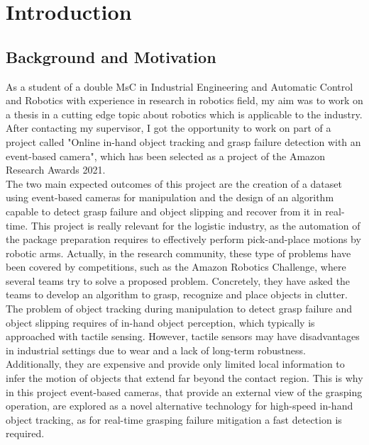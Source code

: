 \cleardoublepage\chapter{Introduction}\label{sec:introduction}

\section{Background and Motivation}

As a student of a double MsC in Industrial Engineering and Automatic Control and Robotics with experience in research in robotics field, my aim was to work on a thesis in a cutting edge topic about robotics which is applicable to the industry. After contacting my supervisor, I got the opportunity to work on part of a project called "Online in-hand object tracking and grasp failure detection with an event-based camera", which has been selected as a project of the Amazon Research Awards 2021.\\

The two main expected outcomes of this project are the creation of a dataset using event-based cameras for manipulation and the design of an algorithm capable to detect grasp failure and object slipping and recover from it in real-time. This project is really relevant for the logistic industry, as the automation of the package preparation requires to effectively perform pick-and-place motions by robotic arms. Actually, in the research community, these type of problems have been covered by competitions, such as the Amazon Robotics Challenge, where several teams try to solve a proposed problem. Concretely, they have asked the teams to develop an algorithm to grasp, recognize and place objects in clutter.\\

The problem of object tracking during manipulation to detect grasp failure and object slipping requires of in-hand object perception, which typically is approached with tactile sensing. However, tactile sensors may have disadvantages in industrial settings due to wear and a lack of long-term robustness. Additionally, they are expensive and provide only limited local information to infer the motion of objects that extend far beyond the contact region. This is why in this project event-based cameras, that provide an external view of the grasping operation, are explored as a novel alternative technology for high-speed in-hand object tracking, as for real-time grasping failure mitigation a fast detection is required.

